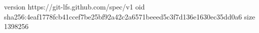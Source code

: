 version https://git-lfs.github.com/spec/v1
oid sha256:4eaf1778fcb41ccef7be25bf92a42c2a6571beeed5c3f7d136e1630ec35dd0a6
size 1398256
